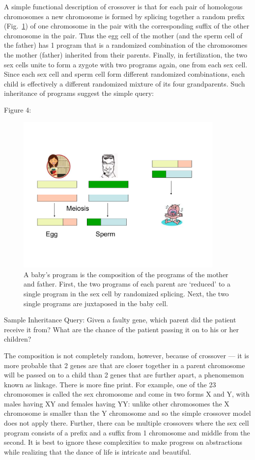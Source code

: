 \documentclass[10pt,fullpage]{article}
\begin{document}
A simple functional description of crossover is that for each pair of
homologous chromosomes a new chromosome is formed by splicing together
a random prefix (Fig.~\ref{fig:recombination}) of one chromosome in
the pair with the corresponding suffix of the other chromosome in the
pair.  Thus the egg cell of the mother (and the sperm cell of the
father) has 1 program that is a randomized combination of the
chromosomes the mother (father) inherited from their parents.
Finally, in fertilization, the two sex cells unite to form a zygote
with two programs again, one from each sex cell.  Since each sex cell
and sperm cell form different randomized combinations, each child is
effectively a different randomized mixture of its four grandparents.
Such inheritance of programs suggest the simple query:

  

Figure 4:
\begin{figure}[h!]
  \centering
  \includegraphics[trim = 10mm 30mm 20mm 40mm, clip, width = 4in]{fig/recombination.pdf}
  \caption{A baby's program is the composition of the programs of the
    mother and father. First, the two programs of each parent are
    `reduced' to a single program in the sex cell by randomized
    splicing.  Next, the two single programs are juxtaposed in the
    baby cell.}
  \label{fig:recombination}
\end{figure}


Sample Inheritance Query: Given a faulty gene, which parent did the
patient receive it from?  What are the chance of the patient passing
it on to his or her children?

The composition is not completely random, however, because of
crossover --- it is more probable that 2 genes are that are closer
together in a parent chromosome will be passed on to a child than 2
genes that are further apart, a phenomemon known as linkage.  There is
more fine print.  For example, one of the 23 chromosomes is called the
sex chromosome and come in two forms X and Y, with males having XY and
females having YY: unlike other chromosomes the X chromosome is
smaller than the Y chromosome and so the simple crossover model does
not apply there.  Further, there can be multiple crossovers where the
sex cell program consists of a prefix and a suffix from 1 chromosome
and middle from the second.  It is best to ignore these complexities
to make progress on abstractions while realizing that the dance of
life is intricate and beautiful.
\end{document}
